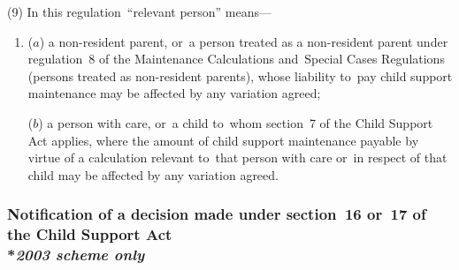 \documentclass[12pt,a4paper]{article}
\begin{document}
(9) In this regulation~“relevant person” means—
\begin{enumerate}\item[]
($a$) a non-resident parent, or~a person treated as a non-resident parent under regulation~8 of the Maintenance Calculations and~Special Cases Regulations (persons treated as non-resident parents), whose liability to~pay child support maintenance may be affected by any variation agreed;

($b$) a person with care, or~a child to~whom section~7 of the Child Support Act applies, where the amount of child support maintenance payable by virtue of a calculation relevant to~that person with care or~in respect of that child may be affected by any variation agreed.
\end{enumerate}


\subsubsection[15C. Notification of a decision made under section~16 or~17 of the Child Support Act]{Notification of a decision made under section~16 or~17 of the Child Support Act\\*\emph{2003 scheme only}}
\end{document}
